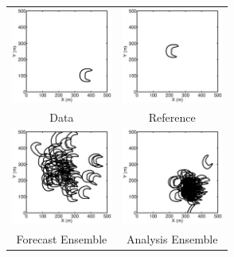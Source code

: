 \documentclass{beamer}
\begin{document}
\begin{frame}
\begin{figure}[t!]
\begin{center}%
\begin{tabular}
[c]{cc}%
\includegraphics[width=1.3in]{eps/da_data}  &
\includegraphics[width=1.3in]{eps/da_fireprofile}\\
Data&Reference\\
\includegraphics[width=1.3in]{eps/da_prior} &
\includegraphics[width=1.3in]{eps/da_posterior}\\
Forecast Ensemble&Analysis Ensemble
\end{tabular}
\newline
\end{center}
\end{figure}

\end{frame}
\end{document}
